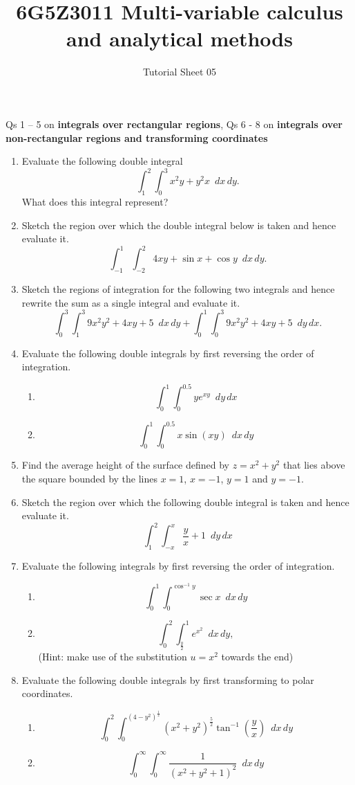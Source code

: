 \documentclass[a4paper]{amsart}
\begin{document}
\title{6G5Z3011 Multi-variable calculus and analytical methods}
\author{Tutorial Sheet 05}
\maketitle

Qs 1 -- 5 on \textbf{integrals over rectangular regions}, Qs 6 - 8 on \textbf{integrals over non-rectangular regions and transforming coordinates}
\begin{enumerate}
    \item
Evaluate the following double integral
$$\int_1^2  \int_0^3 x^2y + y^2 x \, \,\,  dx \, dy .$$
What does this integral represent?
\item
Sketch the region over which the double integral below is taken and hence evaluate it.
$$\int_{-1}^1 \int_{-2}^2 4xy + \sin x + \cos y \,\,\,  dx \, dy.$$
\item
Sketch the regions of integration for the following two integrals and hence rewrite the sum as a single integral and evaluate it.
$$ \int_0^3 \int_1^3 9x^2 y^2 + 4xy + 5 \, \, \, dx \, dy +
\int_0^1 \int_0^3 9x^2 y^2 + 4xy + 5 \, \, \, dy \, dx .$$
\item
Evaluate the following double integrals by first reversing the order of integration.
\begin{enumerate}
\item
$$ \int_0^1 \int_0^{0.5} y e^{xy} \, \, \, dy \, dx $$
\item
$$\int_0^1 \int_0^{0.5} x \sin(xy) \, \, \, dx \, dy $$
\end{enumerate}
\item
Find the average height of the surface defined by $z=x^2 + y^2$ that lies above the square bounded by the lines $x=1$, $x=-1$, $y=1$ and $y=-1$.


\item
Sketch the region over which the following double integral is taken and hence evaluate it.
$$ \int_1^2 \int_{-x}^x \frac{y}{x} + 1 \, \, \, dy \, dx $$
\item
Evaluate the following integrals by first reversing the order of integration.
\begin{enumerate}
\item
$$\int_0^1 \int_0^{\cos^{-1} y} \sec x \, \, \, dx \, dy $$
\item
$$ \int_0^2 \int_{\frac{y}{2}}^1 e^{x^2} \, \, \, dx \, dy,$$
(Hint: make use of the substitution $u=x^2$ towards the end)
\end{enumerate}
\item
Evaluate the following double integrals by first transforming to polar coordinates.
\begin{enumerate}
\item
$$\int_0^2 \int_0^{\left ( 4 - y^2 \right )^{\frac{1}{2}}} \left ( x^2 + y^2 \right )^{\frac{5}{2}} \tan^{-1} \left ( \frac{y}{x} \right ) \, \, \, dx \, dy $$

\item
$$\int_0^\infty \int_0^\infty \frac{1}{\left ( x^2 + y^2 + 1 \right )^2} \, \, \, dx \, dy $$
\end{enumerate}
    \end{enumerate}
\end{document}
